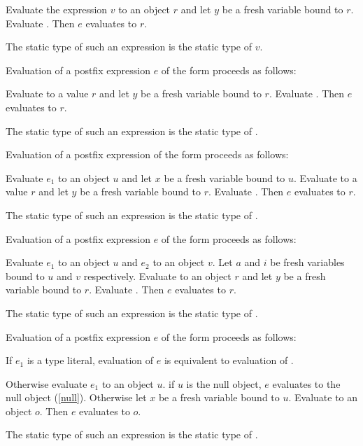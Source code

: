 \documentclass{article}
\begin{document}
\LMHash{}
Evaluate the expression $v$ to an object $r$
and let $y$ be a fresh variable bound to $r$.
Evaluate .
Then $e$ evaluates to $r$.

\LMHash{}
The static type of such an expression is the static type of $v$.

\LMHash{}
Evaluation of a postfix expression $e$ of the form 
proceeds as follows:

\LMHash{}
Evaluate  to a value $r$
and let $y$ be a fresh variable bound to $r$.
Evaluate .
Then $e$ evaluates to $r$.

\LMHash{}
The static type of such an expression is the static type of .

\LMHash{}
Evaluation of a postfix expression of the form 
proceeds as follows:

\LMHash{}
Evaluate $e_1$ to an object $u$ and let $x$ be a fresh variable bound to $u$.
Evaluate  to a value $r$
and let $y$ be a fresh variable bound to $r$.
Evaluate .
Then $e$ evaluates to $r$.

\LMHash{}
The static type of such an expression is the static type of .

\LMHash{}
Evaluation of a postfix expression $e$ of the form 
proceeds as follows:

\LMHash{}
Evaluate $e_1$ to an object $u$ and $e_2$ to an object $v$.
Let $a$ and $i$ be fresh variables bound to $u$ and $v$ respectively.
Evaluate  to an object $r$
and let $y$ be a fresh variable bound to $r$.
Evaluate .
Then $e$ evaluates to $r$.

\LMHash{}
The static type of such an expression is the static type of .

\LMHash{}
Evaluation of a postfix expression $e$ of the form 
proceeds as follows:

\LMHash{}
If $e_1$ is a type literal, evaluation of $e$ is equivalent to
evaluation of .

\LMHash{}
Otherwise evaluate $e_1$ to an object $u$.
if $u$ is the null object, $e$ evaluates to the null object (\ref{null}).
Otherwise let $x$ be a fresh variable bound to $u$.
Evaluate  to an object $o$.
Then $e$ evaluates to $o$.

\LMHash{}
The static type of such an expression is the static type of .
\end{document}
